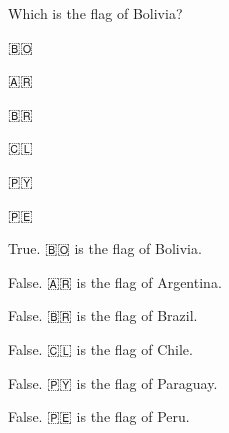 

\begin{question}
Which is the flag of Bolivia?

\begin{answerlist}
  \item 🇧🇴
  \item 🇦🇷
  \item 🇧🇷
  \item 🇨🇱
  \item 🇵🇾
  \item 🇵🇪
\end{answerlist}\end{question}

\begin{solution}
\begin{answerlist}
  \item True. 🇧🇴 is the flag of Bolivia.
  \item False. 🇦🇷 is the flag of Argentina.
  \item False. 🇧🇷 is the flag of Brazil.
  \item False. 🇨🇱 is the flag of Chile.
  \item False. 🇵🇾 is the flag of Paraguay.
  \item False. 🇵🇪 is the flag of Peru.
\end{answerlist}\end{solution}


